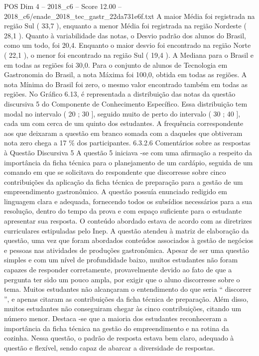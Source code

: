 \begin{textsample}{POS Dim 4 – 2018\_c6 – Score 12.00 – 2018\_c6/enade\_2018\_tec\_gastr\_22da731e6f.txt}
A maior Média foi registrada na região Sul ( 33,7 ), enquanto a menor Média foi registrada na região Nordeste ( 28,1 ).
Quanto à variabilidade das notas, o Desvio padrão dos alunos do Brasil, como um todo, foi 20,4.
Enquanto o maior desvio foi encontrado na região Norte ( 22,1 ), o menor foi encontrado na região Sul ( 19,4 ).
A Mediana para o Brasil e em todas as regiões foi 30,0.
Para o conjunto de alunos de Tecnologia em Gastronomia do Brasil, a nota Máxima foi 100,0, obtida em todas as regiões.
A nota Mínima do Brasil foi zero, o mesmo valor encontrado também em todas as regiões.
No Gráfico 6.13, é representada a distribuição das notas da questão discursiva 5 do Componente de Conhecimento Específico.
Essa distribuição tem modal no intervalo ( 20 ; 30 ], seguido muito de perto do intervalo ( 30 ; 40 ], cada um com cerca de um quinto dos estudantes.
A frequência correspondente aos que deixaram a questão em branco somada com a daqueles que obtiveram nota zero chega a 17 \% dos participantes. 6.3.2.6 Comentários sobre as respostas à Questão Discursiva 5 A questão 5 iniciava -se com uma afirmação a respeito da importância da ficha técnica para o planejamento de um cardápio, seguida de um comando em que se solicitava do respondente que discorresse sobre cinco contribuições da aplicação da ficha técnica de preparação para a gestão de um empreendimento gastronômico.
A questão possuía enunciado redigido em linguagem clara e adequada, fornecendo todos os subsídios necessários para a sua resolução, dentro do tempo da prova e com espaço suficiente para o estudante apresentar sua resposta.
O conteúdo abordado estava de acordo com as diretrizes curriculares estipuladas pelo Inep.
A questão atendeu à matriz de elaboração da questão, uma vez que foram abordados conteúdos associados à gestão de negócios e pessoas nas atividades de produções gastronômica.
Apesar de ser uma questão simples e com um nível de profundidade baixo, muitos estudantes não foram capazes de responder corretamente, provavelmente devido ao fato de que a pergunta ter sido um pouco ampla, por exigir que o aluno discorresse sobre o tema.
Muitos estudantes não alcançaram o entendimento do que seria “ discorrer ”, e apenas citaram as contribuições da ficha técnica de preparação.
Além disso, muitos estudantes não conseguiram chegar às cinco contribuições, citando um número menor.
Destaca -se que a maioria dos estudantes reconheceram a importância da ficha técnica na gestão do empreendimento e na rotina da cozinha.
Nessa questão, o padrão de resposta estava bem claro, adequado à questão e flexível, sendo capaz de abarcar a diversidade de respostas.

\end{textsample}

